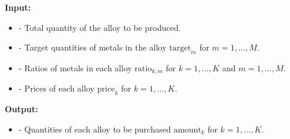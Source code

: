 \documentclass{article}
\begin{document}
\textbf{Input:}
\begin{itemize}
    \item {} - Total quantity of the alloy to be produced.
    \item {} - Target quantities of metals in the alloy \(\text{target}_{m}\) for \( m = 1, \ldots, M \).
    \item {} - Ratios of metals in each alloy \(\text{ratio}_{k, m}\) for \( k = 1, \ldots, K \) and \( m = 1, \ldots, M \).
    \item {} - Prices of each alloy \(\text{price}_{k}\) for \( k = 1, \ldots, K \).
\end{itemize}

\textbf{Output:}
\begin{itemize}
    \item {} - Quantities of each alloy to be purchased \(\text{amount}_{k}\) for \( k = 1, \ldots, K \).
\end{itemize}
\end{document}
